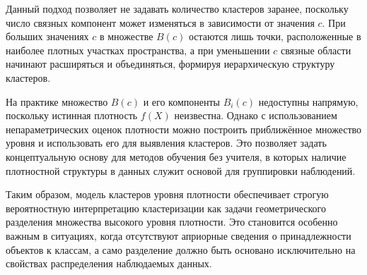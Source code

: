 Данный подход позволяет не задавать количество кластеров заранее, поскольку число связных компонент может изменяться в зависимости от значения \(c\). При больших значениях \(c\) в множестве \(B(c)\) остаются лишь точки, расположенные в наиболее плотных участках пространства, а при уменьшении \(c\) связные области начинают расширяться и объединяться, формируя иерархическую структуру кластеров.

На практике множество \(B(c)\) и его компоненты \(B_i(c)\) недоступны напрямую, поскольку истинная плотность \(f(X)\) неизвестна. Однако с использованием непараметрических оценок плотности можно построить приближённое множество уровня и использовать его для выявления кластеров. Это позволяет задать концептуальную основу для методов обучения без учителя, в которых наличие плотностной структуры в данных служит основой для группировки наблюдений.

Таким образом, модель кластеров уровня плотности обеспечивает строгую вероятностную интерпретацию кластеризации как задачи геометрического разделения множества высокого уровня плотности. Это становится особенно важным в ситуациях, когда отсутствуют априорные сведения о принадлежности объектов к классам, а само разделение должно быть основано исключительно на свойствах распределения наблюдаемых данных.
